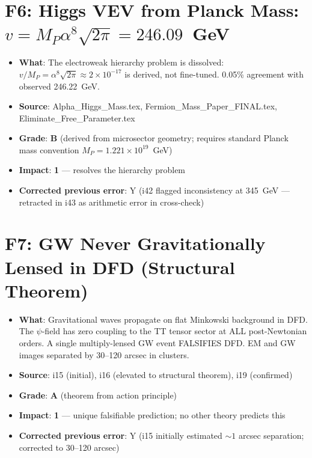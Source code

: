 \documentclass[11pt,a4paper]{article}
\newcommand{\grade}[1]{\textbf{#1}}
\newcommand{\impact}[1]{\textbf{#1}}
\begin{document}
\section{F6: Higgs VEV from Planck Mass: $v = M_P \alpha^8 \sqrt{2\pi} = 246.09$~GeV}
\begin{itemize}[nosep]
\item \textbf{What}: The electroweak hierarchy problem is dissolved: $v/M_P = \alpha^8\sqrt{2\pi} \approx 2 \times 10^{-17}$ is derived, not fine-tuned. 0.05\% agreement with observed 246.22~GeV.
\item \textbf{Source}: Alpha\_Higgs\_Mass.tex, Fermion\_Mass\_Paper\_FINAL.tex, Eliminate\_Free\_Parameter.tex
\item \textbf{Grade}: \grade{B} (derived from microsector geometry; requires standard Planck mass convention $M_P = 1.221 \times 10^{19}$~GeV)
\item \textbf{Impact}: \impact{1} --- resolves the hierarchy problem
\item \textbf{Corrected previous error}: Y (i42 flagged inconsistency at 345~GeV --- retracted in i43 as arithmetic error in cross-check)
\end{itemize}

\section{F7: GW Never Gravitationally Lensed in DFD (Structural Theorem)}
\begin{itemize}[nosep]
\item \textbf{What}: Gravitational waves propagate on flat Minkowski background in DFD. The $\psi$-field has zero coupling to the TT tensor sector at ALL post-Newtonian orders. A single multiply-lensed GW event FALSIFIES DFD. EM and GW images separated by 30--120 arcsec in clusters.
\item \textbf{Source}: i15 (initial), i16 (elevated to structural theorem), i19 (confirmed)
\item \textbf{Grade}: \grade{A} (theorem from action principle)
\item \textbf{Impact}: \impact{1} --- unique falsifiable prediction; no other theory predicts this
\item \textbf{Corrected previous error}: Y (i15 initially estimated $\sim 1$ arcsec separation; corrected to 30--120 arcsec)
\end{itemize}
\end{document}
